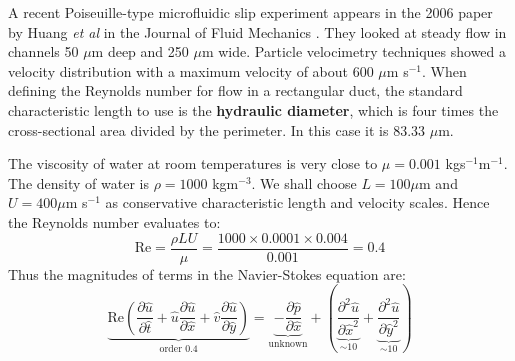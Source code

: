 \documentclass[12pt, a4paper, twoside, openright]{book}
\begin{document}
A recent Poiseuille-type microfluidic slip experiment appears in the 2006 paper by Huang \emph{et al} in the Journal of Fluid Mechanics \cite{Huang2006}.  They looked at steady flow in channels 50 $\mu$m deep and 250 $\mu$m wide.  Particle velocimetry techniques showed a velocity distribution with a maximum velocity of about 600 $\mu$m s$^{-1}$.
When defining the Reynolds number for flow in a rectangular duct, the standard characteristic length to use is the \textbf{hydraulic diameter}, which is four times the cross-sectional area divided by the perimeter.  In this case it is 83.33 $\mu$m.

The viscosity of water at room temperatures is very close to $\mu = 0.001$ kgs$^{-1}$m$^{-1}$.  The density of water is $\rho = 1000$ kgm$^{-3}$.  We shall choose $L = 100 \mu$m and $U = 400 \mu$m s$^{-1}$ as conservative characteristic length and velocity scales.
Hence the Reynolds number evaluates to:
\begin{equation}
\mathrm{Re} = \frac{\rho L U}{\mu} = \frac{1000 \times 0.0001 \times 0.004}{0.001} = 0.4
\end{equation}
%
Thus the magnitudes of terms in the Navier-Stokes equation are:
\begin{equation}
\underbrace{
\mathrm{Re} \left( 
             \frac{\partial \hat{u}}{\partial \hat{t}}  +
     \hat{u} \frac{\partial \hat{u}}{\partial \hat{x}}  +
     \hat{v} \frac{\partial \hat{u}}{\partial \hat{y}} 
           \right)
}_{\text{order 0.4}}   = 
\underbrace{ - \frac{\partial \hat{p}}{\partial \hat{x}} }_{\text{unknown}}
  + \left( 
\underbrace{ \frac{\partial^2 \hat{u}}{\partial \hat{x}^2} }_{\sim 10} + 
\underbrace{ \frac{\partial^2 \hat{u}}{\partial \hat{y}^2} }_{\sim 10} 
\right)
\end{equation}
\end{document}
